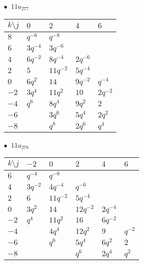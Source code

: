 \begin{minipage}{\linewidth}
$\bullet\ $ $11a_{277}$ \vspace{0.5em} \\
\begin{tabular}{l|llll}
$k \setminus j$ & $0$ & $2$ & $4$ & $6$ \\
\hline
$8$ & $q^{-6}$ & $q^{-8}$ &  &  \\
$6$ & $3q^{-4}$ & $3q^{-6}$ &  &  \\
$4$ & $6q^{-2}$ & $8q^{-4}$ & $2q^{-6}$ &  \\
$2$ & $5$ & $11q^{-2}$ & $5q^{-4}$ &  \\
$0$ & $6q^{2}$ & $14$ & $9q^{-2}$ & $q^{-4}$ \\
$-2$ & $3q^{4}$ & $11q^{2}$ & $10$ & $2q^{-2}$ \\
$-4$ & $q^{6}$ & $8q^{4}$ & $9q^{2}$ & $2$ \\
$-6$ &  & $3q^{6}$ & $5q^{4}$ & $2q^{2}$ \\
$-8$ &  & $q^{8}$ & $2q^{6}$ & $q^{4}$ \\
\end{tabular}
\vspace{2em}
\end{minipage}
%
\begin{minipage}{\linewidth}
$\bullet\ $ $11a_{278}$ \vspace{0.5em} \\
\begin{tabular}{l|lllll}
$k \setminus j$ & $-2$ & $0$ & $2$ & $4$ & $6$ \\
\hline
$6$ & $q^{-4}$ & $q^{-6}$ &  &  &  \\
$4$ & $3q^{-2}$ & $4q^{-4}$ & $q^{-6}$ &  &  \\
$2$ & $6$ & $11q^{-2}$ & $5q^{-4}$ &  &  \\
$0$ & $3q^{2}$ & $14$ & $12q^{-2}$ & $2q^{-4}$ &  \\
$-2$ & $q^{4}$ & $11q^{2}$ & $16$ & $6q^{-2}$ &  \\
$-4$ &  & $4q^{4}$ & $12q^{2}$ & $9$ & $q^{-2}$ \\
$-6$ &  & $q^{6}$ & $5q^{4}$ & $6q^{2}$ & $2$ \\
$-8$ &  &  & $q^{6}$ & $2q^{4}$ & $q^{2}$ \\
\end{tabular}
\vspace{2em}
\end{minipage}
%
